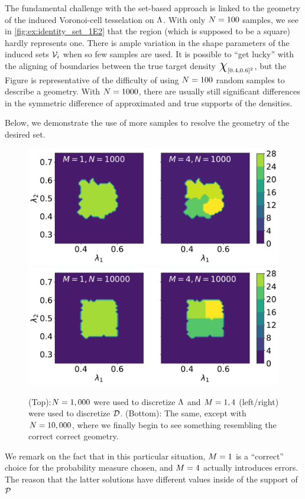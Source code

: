 The fundamental challenge with the set-based approach is linked to the geometry of the induced Voronoi-cell tesselation on ${\Lambda}$.
With only $N = 100$ samples, we see in \ref{fig:ex:identity_set_1E2} that the region (which is supposed to be a square) hardly represents one.
There is ample variation in the shape parameters of the induced sets $\mathcal{V}_i$ when so few samples are used.
It is possible to ``get lucky'' with the aligning of boundaries between the true target density $\Chi_{[0.4, 0.6]^2}$, but the Figure is representative of the difficulty of using $N = 100$ random samples to describe a geometry.
With $N = 1000$, there are usually still significant differences in the symmetric difference of approximated and true supports of the densities.

Below, we demonstrate the use of more samples to resolve the geometry of the desired set.
\begin{figure}[ht]
\begin{minipage}{.975\textwidth}
  \includegraphics[width=\linewidth]{./examples/identity/set/M1-N1000_N1000-vs-M4-N1000_N1000.pdf}
  \includegraphics[width=\linewidth]{./examples/identity/set/M1-N10000_N10000-vs-M4-N10000_N10000.pdf}
\end{minipage}
\caption{
(Top):$N=1,000$ were used to discretize ${\Lambda}$ and $M=1, 4$ (left/right) were used to discretize $\mathcal{D}$.
(Bottom): The same, except with $N=10,000$, where we finally begin to see something resembling the correct correct geometry.
}
\label{fig:ex:identity_set_1E3_1E4}
\end{figure}
\FloatBarrier

We remark on the fact that in this particular situation, $M = 1$ is a ``correct'' choice for the probability measure chosen, and $M = 4$ actually introduces errors.
The reason that the latter solutions have different values inside of the support of $\mathcal{P}$
